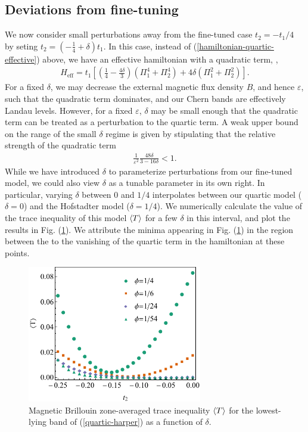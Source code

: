 \documentclass[aps,prb,twocolumn,letterpaper,twoside,nobalancelastpage,groupedaddress,amsmath,amssymb,floatfix,citeautoscript]{revtex4-1}
\begin{document}
\subsection{Deviations from fine-tuning}
We now consider small perturbations away from the fine-tuned case $t_2 = -t_1/4$ by seting $t_2 = \left(-\frac{1}{4} + \delta\right)t_1$. In this case, instead of (\ref{hamiltonian-quartic-effective}) above, we have an effective hamiltonian with a quadratic term, ,
\begin{align}
\label{delta-hamiltonian}
H_{\text{eff}} = t_1 \left[\left(\frac{1}{4}-\frac{4\delta}{3}\right)\left(\Pi_1^4 + \Pi_2^4\right) + 4\delta \left(\Pi_1^2 + \Pi_2^2\right)\right].
\end{align}
For a fixed $\delta$, we may decrease the external magnetic flux density $B$, and hence $\varepsilon$, such that the quadratic term dominates, and our Chern bands are effectively Landau levels. However, for a fixed $\varepsilon$, $\delta$ may be small enough that the quadratic term can be treated as a perturbation to the quartic term. A weak upper bound on the range of the small $\delta$ regime is given by stipulating that the relative strength of the quadratic term 
\begin{align*}
\frac{1}{\varepsilon^2}\frac{48\delta}{3-16\delta} < 1.
\end{align*}
While we have introduced $\delta$ to parameterize perturbations from our fine-tuned model, we could also view $\delta$ as a tunable parameter in its own right. In particular, varying $\delta$ between $0$ and $1/4$ interpolates between our quartic model ($\delta=0$) and the Hofstadter model ($\delta=1/4$). We numerically calculate the value of the trace inequality of this model $\expval{T}$ for a few $\delta$ in this interval, and plot the results in Fig. (\ref{trace-delta-plot}). We attribute the minima appearing in Fig. (\ref{trace-delta-plot}) in the region between the to the vanishing of the quartic term in the hamiltonian at these points.

\begin{figure}[thb]
\centering
\includegraphics[width=3.0in]{trace-delta-plot-new.pdf}
\caption{\label{trace-delta-plot}Magnetic Brillouin zone-averaged trace inequality $\expval{T}$ for the lowest-lying band of (\ref{quartic-harper}) as a function of $\delta$.}
\end{figure}
\end{document}
